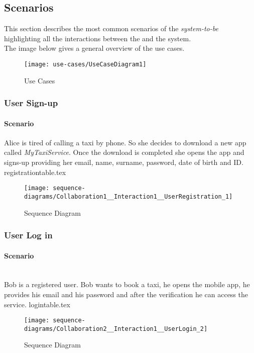 
\subsection{Scenarios}
\label{sec:scenarios}
This section describes the most common scenarios of the \emph{system-to-be} highlighting all the interactions between the \emph{} and the system.\\
The image below gives a general overview of the use cases.


\begin{figure}[h!]
\caption{Use Cases}
\texttt{[image: use-cases/UseCaseDiagram1]}
\centering
\end{figure}

\newpage

\subsubsection{User Sign-up} 
\label{ssub:sign_up_scenario}
\paragraph{Scenario} 
Alice is tired of calling a taxi by phone. So she decides to download a new app called \emph{MyTaxiService}.
Once the download is completed she opens the app and signs-up providing her email, name, surname, password, date of birth and ID.
{registrationtable.tex}

\newpage
\vfill
\begin{figure}
\caption{Sequence Diagram}
\texttt{[image: sequence-diagrams/Collaboration1\_\_Interaction1\_\_UserRegistration\_1]}
\centering
\end{figure}
\vfill
\clearpage


\subsubsection{User Log in} 
\label{ssub:login_scenario}
\paragraph{Scenario} \hfill \\
Bob is a registered user. Bob wants to book a taxi, he opens the mobile app, he provides his email and his password and after the verification he can access the service.
{logintable.tex}
\newpage
\vfill
\begin{figure}
\caption{Sequence Diagram}
\texttt{[image: sequence-diagrams/Collaboration2\_\_Interaction1\_\_UserLogin\_2]}
\centering
\end{figure}
\vfill
\clearpage

